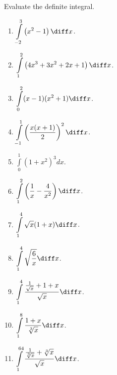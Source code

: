 Evaluate the definite integral.
\begin{multicols}{3}
\begin{enumerate}[ref={\fcProblemRef}]
\item $\displaystyle \int\limits_{-2}^{3} \left(x^2-1 \right)  \diff x$.


\item $\displaystyle \int\limits_{1}^{2} \left(4x^3+3x^2+2x+1\right)  \diff x$.

\item $\displaystyle \int\limits_{0}^{2}(x-1)(x^2+1)  \diff x$.

\item $\displaystyle \int\limits_{-1}^{1} \left( \frac{x(x+1) }{ 2} \right)^2  \diff x$.

\item $\displaystyle \int\limits_{0}^{1}(1+x^2)^3 dx$.

\item $\displaystyle \int \limits_{1}^{2} \left(\frac{1}{x} - \frac{4}{x^2} \right)  \diff x$.

\item $\displaystyle \int\limits_{1}^{4}\sqrt{x}(1+x) \diff x$.

\item $\displaystyle \int\limits_{1}^{4} \sqrt{ \frac{6 }{x }} \diff x$.

\item $\displaystyle \int \limits_{1}^{4} \frac{ \frac{ 1}{ \sqrt{x}}+1+x}{ \sqrt{x}}  \diff x$.

\item $\displaystyle \int \limits_{1}^{8} \frac{1+x}{ \sqrt[3]{x}} \diff x$.

\item $\displaystyle \int\limits_{1}^{64} \frac{\frac{1}{ \sqrt[3]{x}} +\sqrt[3]{x}}{ \sqrt{x}}\diff x$.


\end{enumerate}
\end{multicols}
